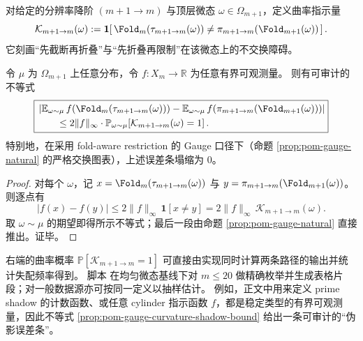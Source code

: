 \begin{definition}\label{def:pom-gauge-curvature}
对给定的分辨率降阶 \((m{+}1\to m)\) 与顶层微态 \(\omega\in\Omega_{m+1}\)，定义曲率指示量
\[
\mathcal{K}_{m+1\to m}(\omega)
:=
\mathbf 1\!\left[\,
\Fold_m(\tau_{m+1\to m}(\omega))
\neq
\pi_{m+1\to m}(\Fold_{m+1}(\omega))
\,\right].
\]
它刻画“先截断再折叠”与“先折叠再限制”在该微态上的不交换障碍。
\end{definition}

\begin{proposition}\label{prop:pom-gauge-curvature-shadow-bound}
令 \(\mu\) 为 \(\Omega_{m+1}\) 上任意分布，令 \(f:X_m\to\mathbb{R}\) 为任意有界可观测量。
则有可审计的不等式
\[
\boxed{
\begin{aligned}
&\left|\mathbb E_{\omega\sim\mu}\,f(\Fold_m(\tau_{m+1\to m}(\omega)))
-\mathbb E_{\omega\sim\mu}\,f(\pi_{m+1\to m}(\Fold_{m+1}(\omega)))\right|\\
&\qquad \le 2\|f\|_\infty\cdot \mathbb P_{\omega\sim\mu}\!\left[\mathcal{K}_{m+1\to m}(\omega)=1\right].
\end{aligned}}
\]
特别地，在采用 fold-aware restriction 的 Gauge 口径下（命题 \ref{prop:pom-gauge-natural} 的严格交换图表），上述误差条塌缩为 \(0\)。
\end{proposition}
\begin{proof}
对每个 \(\omega\)，记
\(
x=\Fold_m(\tau_{m+1\to m}(\omega))
\)
与
\(
y=\pi_{m+1\to m}(\Fold_{m+1}(\omega))
\)。
则逐点有
\[
|f(x)-f(y)|
\le
2\|f\|_\infty\,\mathbf 1[x\neq y]
=
2\|f\|_\infty\,\mathcal{K}_{m+1\to m}(\omega).
\]
取 \(\omega\sim\mu\) 的期望即得所示不等式；最后一段由命题 \ref{prop:pom-gauge-natural} 直接推出。证毕。
\end{proof}

\begin{remark}\label{rem:pom-gauge-curvature-audit}
右端的曲率概率
\(\mathbb P[\mathcal{K}_{m+1\to m}=1]\)
可直接由实现同时计算两条路径的输出并统计失配频率得到。
脚本  在均匀微态基线下对 \(m\le 20\) 做精确枚举并生成表格片段；对一般数据源亦可按同一定义以抽样估计。
例如，正文中用来定义 prime shadow 的计数函数、或任意 cylinder 指示函数 \(f\)，都是稳定类型的有界可观测量，因此不等式 \ref{prop:pom-gauge-curvature-shadow-bound} 给出一条可审计的“伪影误差条”。
\end{remark}



